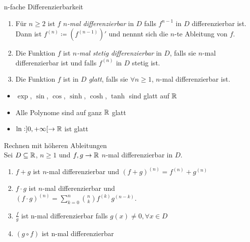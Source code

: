 \begin{definition}{n-fache Differenzierbarkeit}
	\begin{enumerate}
		\item Für $n \geq 2$ ist $f$ \emph{$n$-mal differenzierbar} in $D$ falls $f^{n-1}$ in $D$ differenzierbar ist. Dann ist $f^{(n)} \coloneqq \left(f^{(n-1)}\right)'$ und nennnt sich die $n$-te Ableitung von $f$.
		\item Die Funktion $f$ ist \emph{$n$-mal stetig differenzierbar} in $D$, falls sie $n$-mal differenzierbar ist und falls $f^{(n)}$ in $D$ stetig ist.
		\item Die Funktion $f$ ist in $D$ \emph{glatt}, falls sie $\forall n \geq 1$, $n$-mal differenzierbar ist. 
	\end{enumerate}
\end{definition}


\begin{itemize}
	\item $\exp$, $\sin$, $\cos$, $\sinh$, $\cosh$, $\tanh$ sind glatt auf $\mathbb{R}$
	\item Alle Polynome sind auf ganz $\mathbb{R}$ glatt
	\item $\ln : ]0, + \infty[ \to \mathbb{R}$ ist glatt
\end{itemize}

\begin{theorem}{Rechnen mit höheren Ableitungen}\\
	Sei $D \subseteq \mathbb{R}$, $n \geq 1$ und $f,g \to \mathbb{R}$ $n$-mal differenzierbar in $D$.
	\begin{enumerate}
		\item $f+g$ ist $n$-mal differenzierbar und $(f + g)^{(n)} = f^{(n)} + g^{(n)}$
		\item $f \cdot g$ ist $n$-mal differenzierbar und\\ $(f \cdot g)^{(n)} = \sum_{k=0}^n \binom{n}{k} f^{(k)} g^{(n-k)}$.
        \item $\frac{f}{g}$ ist n-mal differenzierbar falls $g(x) \neq 0, \forall x \in D$
        \item $(g \circ f)$ ist n-mal differenzierbar
	\end{enumerate}
\end{theorem}





